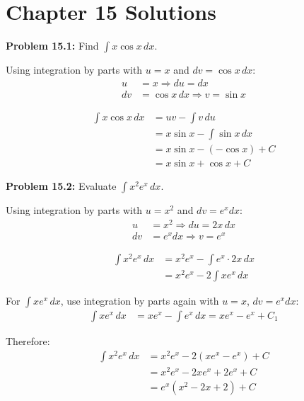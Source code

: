 \documentclass[12pt,a4paper]{book}
\theoremstyle{definition}
\begin{document}
\section*{Chapter 15 Solutions}

\begin{solution}
\textbf{Problem 15.1:} Find $\int x \cos x \, dx$.

Using integration by parts with $u = x$ and $dv = \cos x \, dx$:
\begin{align}
u &= x \Rightarrow du = dx\\
dv &= \cos x \, dx \Rightarrow v = \sin x
\end{align}

\begin{align}
\int x \cos x \, dx &= uv - \int v \, du\\
&= x \sin x - \int \sin x \, dx\\
&= x \sin x - (-\cos x) + C\\
&= x \sin x + \cos x + C
\end{align}
\end{solution}

\begin{solution}
\textbf{Problem 15.2:} Evaluate $\int x^2 e^x \, dx$.

Using integration by parts with $u = x^2$ and $dv = e^x dx$:
\begin{align}
u &= x^2 \Rightarrow du = 2x \, dx\\
dv &= e^x dx \Rightarrow v = e^x
\end{align}

\begin{align}
\int x^2 e^x \, dx &= x^2 e^x - \int e^x \cdot 2x \, dx\\
&= x^2 e^x - 2\int xe^x \, dx
\end{align}

For $\int xe^x \, dx$, use integration by parts again with $u = x$, $dv = e^x dx$:
\begin{align}
\int xe^x \, dx &= xe^x - \int e^x \, dx = xe^x - e^x + C_1
\end{align}

Therefore:
\begin{align}
\int x^2 e^x \, dx &= x^2 e^x - 2(xe^x - e^x) + C\\
&= x^2 e^x - 2xe^x + 2e^x + C\\
&= e^x(x^2 - 2x + 2) + C
\end{align}
\end{solution}
\end{document}
